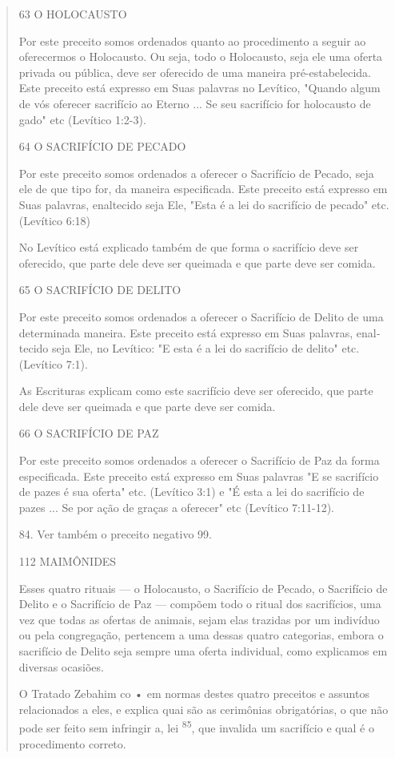\begin{quote}
63 O HOLOCAUSTO

Por este preceito somos ordenados quanto ao procedimento a se­guir ao
oferecermos o Holocausto. Ou seja, todo o Holocausto, seja ele uma
oferta privada ou pública, deve ser oferecido de uma maneira
pré-estabelecida. Este preceito está expresso em Suas palavras no
Levítico, "Quando algum de vós oferecer sacrifício ao Eterno ... Se seu
sacrifício for holocausto de gado" etc (Levítico 1:2-3).

64 O SACRIFÍCIO DE PECADO

Por este preceito somos ordenados a oferecer o Sacrifício de Peca­do,
seja ele de que tipo for, da maneira especificada. Este preceito está
expres­so em Suas palavras, enaltecido seja Ele, "Esta é a lei do
sacrifício de pecado" etc. (Levítico 6:18)

No Levítico está explicado também de que forma o sacrifício deve ser
oferecido, que parte dele deve ser queimada e que parte deve ser comida.

65 O SACRIFÍCIO DE DELITO

Por este preceito somos ordenados a oferecer o Sacrifício de Delito de
uma determinada maneira. Este preceito está expresso em Suas palavras,
enal­tecido seja Ele, no Levítico: "E esta é a lei do sacrifício de
delito" etc. (Leví­tico 7:1).

As Escrituras explicam como este sacrifício deve ser oferecido, que
parte dele deve ser queimada e que parte deve ser comida.

66 O SACRIFÍCIO DE PAZ

Por este preceito somos ordenados a oferecer o Sacrifício de Paz da
forma especificada. Este preceito está expresso em Suas palavras "E se
sacrifí­cio de pazes é sua oferta" etc. (Levítico 3:1) e "É esta a lei
do sacrifício de pazes ... Se por ação de graças a oferecer" etc
(Levítico 7:11-12).

84. Ver também o preceito negativo 99.

112 MAIMÔNIDES

Esses quatro rituais --- o Holocausto, o Sacrifício de Pecado, o
Sacri­fício de Delito e o Sacrifício de Paz --- compõem todo o ritual
dos sacrifícios, uma vez que todas as ofertas de animais, sejam elas
trazidas por um indivíduo ou pela congregação, pertencem a uma dessas
quatro categorias, embora o sa­crifício de Delito seja sempre uma oferta
individual, como explicamos em di­versas ocasiões.

O Tratado Zebahim co • em normas destes quatro preceitos e as­suntos
relacionados a eles, e explica quai são as cerimônias obrigatórias, o
que não pode ser feito sem infringir a, lei \textsuperscript{85}, que
invalida um sacrifício e qual é o procedimento correto.


\end{quote}
